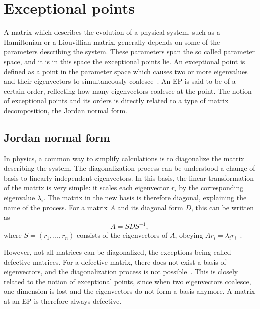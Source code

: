 \documentclass[../main.tex]{subfiles}
\begin{document}

\section{Exceptional points}\label{sec:ep}
A matrix which describes the evolution of a physical system, such as a Hamiltonian or a Liouvillian matrix, generally depends on some of the parameters describing the system. These parameters span the so called parameter space, and it is in this space the exceptional points lie. An exceptional point is defined as a point in the parameter space which causes two or more eigenvalues and their eigenvectors to simultaneously coalesce~\cite{nonHermrev}. An EP is said to be of a certain order, reflecting how many eigenvectors coalesce at the point. The notion of exceptional points and its orders is directly related to a type of matrix decomposition, the Jordan normal form.

\subsection{Jordan normal form}

In physics, a common way to simplify calculations is to diagonalize the matrix describing the system. The diagonalization process can be understood a change of basis to linearly independent eigenvectors. In this basis, the linear transformation of the matrix is very simple: it scales each eigenvector $r_i$ by the corresponding eigenvalue $\lambda_i$. The matrix in the new basis is therefore diagonal, explaining the name of the process. For a matrix $A$ and its diagonal form $D$, this can be written as 
\begin{equation}
    A = SDS^{-1},
\end{equation}
where $S = (r_1, \dots ,r_n)$ consists of the eigenvectors of $A$, obeying $Ar_i=\lambda_ir_i$~\cite{uffe}.

However, not all matrices can be diagonalized, the exceptions being called defective matrices. For a defective matrix, there does not exist a basis of eigenvectors, and the diagonalization process is not possible~\cite{uffe}. This is closely related to the notion of exceptional points, since when two eigenvectors coalesce, one dimension is lost and the eigenvectors do not form a basis anymore. A matrix at an EP is therefore always defective.
\end{document}
